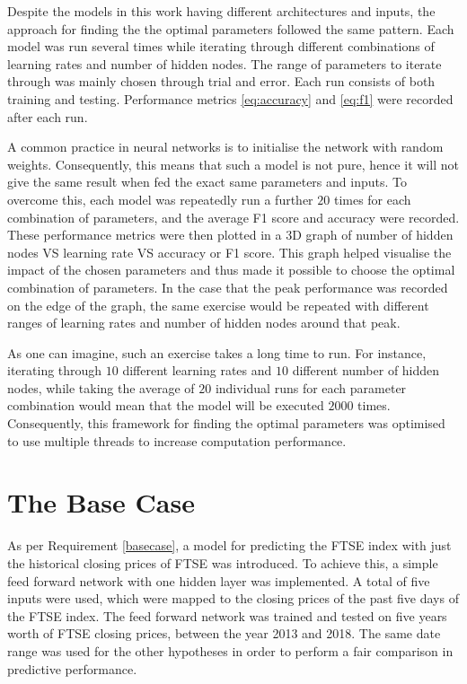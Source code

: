 \documentclass{UoYCSproject}
\begin{document}
Despite the models in this work having different architectures and inputs, the approach for finding the the optimal parameters followed the same pattern. Each model was run several times while iterating through different combinations of learning rates and number of hidden nodes. The range of parameters to iterate through was mainly chosen through trial and error. Each run consists of both training and testing. Performance metrics \ref{eq:accuracy} and \ref{eq:f1} were recorded after each run.

A common practice in neural networks is to initialise the network with random weights. Consequently, this means that such a model is not pure, hence it will not give the same result when fed the exact same parameters and inputs. To overcome this, each model was repeatedly run a further $20$ times for each combination of parameters, and the average F1 score and accuracy were recorded. These performance metrics were then plotted in a 3D graph of number of hidden nodes VS learning rate VS accuracy or F1 score. This graph helped visualise the impact of the chosen parameters and thus made it possible to choose the optimal combination of parameters. In the case that the peak performance was recorded on the edge of the graph, the same exercise would be repeated with different ranges of learning rates and number of hidden nodes around that peak.

As one can imagine, such an exercise takes a long time to run. For instance, iterating through $10$ different learning rates and $10$ different number of hidden nodes, while taking the average of $20$ individual runs for each parameter combination would mean that the model will be executed $2000$ times. Consequently, this framework for finding the optimal parameters was optimised to use multiple threads to increase computation performance.   

\section{The Base Case}
\label{sec:thebasecase}
As per Requirement \ref{basecase}, a model for predicting the FTSE index with just the historical closing prices of FTSE was introduced.  To achieve this, a simple feed forward network with one hidden layer was implemented. A total of five inputs were used, which were mapped to the closing prices of the past five days of the FTSE index. The feed forward network was trained and tested on five years worth of FTSE closing prices, between the year 2013 and 2018. The same date range was used for the other hypotheses in order to perform a fair comparison in predictive performance.
\end{document}
